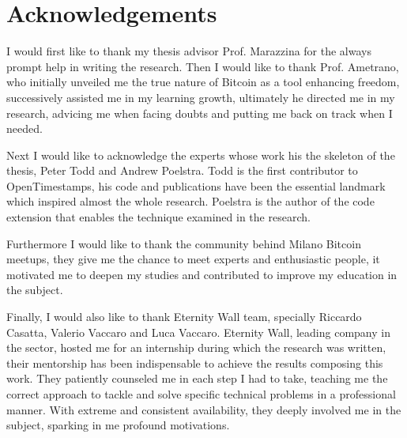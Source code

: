 \chapter{Acknowledgements}
\label{chpr:acknowledgement}

I would first like to thank my thesis advisor Prof. Marazzina for the always prompt help in writing the research.
Then I would like to thank Prof. Ametrano, who initially unveiled me the true nature of Bitcoin as a tool enhancing freedom, successively assisted me in my learning growth, ultimately he directed me in my research, advicing me when facing doubts and putting me back on track when I needed. 

Next I would like to acknowledge the experts whose work his the skeleton of the thesis, Peter Todd and Andrew Poelstra.
Todd is the first contributor to OpenTimestamps, his code and publications have been the essential landmark which inspired almost the whole research.
Poelstra is the author of the code extension that enables the technique examined in the research.

Furthermore I would like to thank the community behind Milano Bitcoin meetups, they give me the chance to meet experts and enthusiastic people, it motivated me to deepen my studies and contributed to improve my education in the subject.

Finally, I would also like to thank Eternity Wall team, specially Riccardo Casatta, Valerio Vaccaro and Luca Vaccaro.
Eternity Wall, leading company in the sector, hosted me for an internship during which the research was written, 
their mentorship has been indispensable to achieve the results composing this work.
They patiently counseled me in each step I had to take, teaching me the correct approach to tackle and solve specific technical problems in a professional manner. 
With extreme and consistent availability, they deeply involved me in the subject, sparking in me profound motivations.